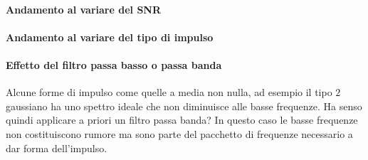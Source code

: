 \paragraph{Andamento al variare del SNR}



\paragraph{Andamento al variare del tipo di impulso}



\paragraph{Effetto del filtro passa basso o passa banda}
Alcune forme di impulso come quelle a media non nulla, ad esempio il tipo $2$ gaussiano
ha uno spettro ideale che non diminuisce alle basse frequenze. Ha senso quindi applicare a priori un filtro passa banda? In questo caso le basse frequenze non costituiscono rumore ma sono parte del pacchetto di frequenze necessario a dar forma dell'impulso.
